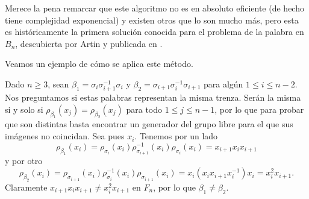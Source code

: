\documentclass[TFG.tex]{subfiles}
\begin{document}
Merece la pena remarcar que este algoritmo no es en absoluto eficiente (de hecho tiene complejidad exponencial) y existen otros que lo son mucho más, pero esta es históricamente la primera solución conocida para el problema de la palabra en $B_n$, descubierta por Artin y publicada en \cite{ArtinA}.

Veamos un ejemplo de cómo se aplica este método.
\begin{ej}
Dado $n\geq 3$, sean $\beta_1=\sigma_i\sigma_{i+1}^{-1}\sigma_i$ y $\beta_2=\sigma_{i+1}\sigma_i^{-1}\sigma_{i+1}$ para algún $1\leq i\leq n-2$. Nos preguntamos si estas palabras representan la misma trenza. Serán la misma si y solo si $\rho_{\beta_1}(x_j)=\rho_{\beta_2}(x_j)$ para todo $1\leq j\leq n-1$, por lo que para probar que son distintas basta encontrar un generador del grupo libre para el que sus imágenes no coincidan. Sea pues $x_i$. Tenemos por un lado
$$\rho_{\beta_1}(x_i)=\rho_{\sigma_i}(x_i)\rho^{-1}_{\sigma_{i+1}}(x_i)\rho_{\sigma_i}(x_i)=
x_{i+1}x_ix_{i+1}$$
y por otro
$$\rho_{\beta_2}(x_i)=\rho_{\sigma_{i+1}}(x_i)\rho_{\sigma_i}^{-1}(x_i)\rho_{\sigma_{i+1}}(x_i)=
x_i (x_i x_{i+1} x_i^{-1})x_i=x_i^2x_{i+1}.$$
Claramente $x_{i+1}x_ix_{i+1}\neq x_i^2x_{i+1}$ en $F_n$, por lo que $\beta_1\neq\beta_2$.
\end{ej}
\end{document}
